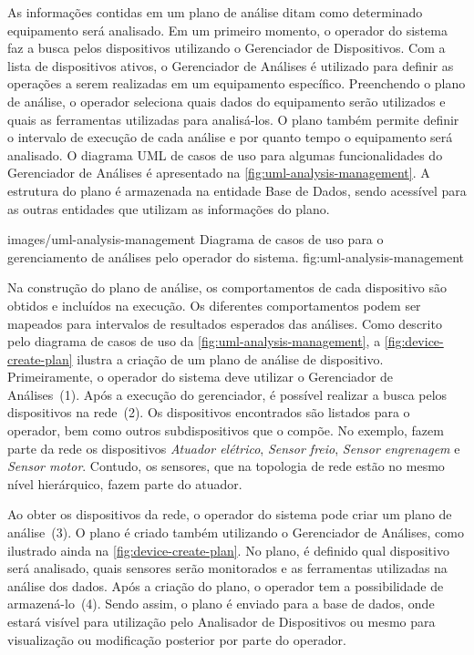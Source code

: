 As informações contidas em um plano de análise ditam como determinado equipamento será analisado. Em
um primeiro momento, o operador do sistema faz a busca pelos dispositivos utilizando o Gerenciador
de Dispositivos. Com a lista de dispositivos ativos, o Gerenciador de Análises é utilizado para
definir as operações a serem realizadas em um equipamento específico. Preenchendo o plano de
análise, o operador seleciona quais dados do equipamento serão utilizados e quais as ferramentas
utilizadas para analisá-los. O plano também permite definir o intervalo de execução de cada análise
e por quanto tempo o equipamento será analisado. O diagrama \gls{UML} de casos de uso para algumas
funcionalidades do Gerenciador de Análises é apresentado na \cref{fig:uml-analysis-management}. A
estrutura do plano é armazenada na entidade Base de Dados, sendo acessível para as outras entidades
que utilizam as informações do plano.

  {images/uml-analysis-management}
  {Diagrama de casos de uso para o gerenciamento de análises pelo operador do sistema.}
  {fig:uml-analysis-management}

Na construção do plano de análise, os comportamentos de cada dispositivo são obtidos e incluídos na
execução. Os diferentes comportamentos podem ser mapeados para intervalos de resultados esperados
das análises. Como descrito pelo diagrama de casos de uso da \cref{fig:uml-analysis-management}, a
\cref{fig:device-create-plan} ilustra a criação de um plano de análise de dispositivo.
Primeiramente, o operador do sistema deve utilizar o Gerenciador de Análises~(1). Após a execução do
gerenciador, é possível realizar a busca pelos dispositivos na rede~(2). Os dispositivos encontrados
são listados para o operador, bem como outros subdispositivos que o compõe. No exemplo, fazem parte
da rede os dispositivos \emph{Atuador elétrico}, \emph{Sensor freio}, \emph{Sensor engrenagem} e
\emph{Sensor motor}. Contudo, os sensores, que na topologia de rede estão no mesmo nível
hierárquico, fazem parte do atuador.

Ao obter os dispositivos da rede, o operador do sistema pode criar um plano de análise~(3). O plano
é criado também utilizando o Gerenciador de Análises, como ilustrado ainda na
\cref{fig:device-create-plan}. No plano, é definido qual dispositivo será analisado, quais sensores
serão monitorados e as ferramentas utilizadas na análise dos dados. Após a criação do plano, o
operador tem a possibilidade de armazená-lo~(4). Sendo assim, o plano é enviado para a base de
dados, onde estará visível para utilização pelo Analisador de Dispositivos ou mesmo para
visualização ou modificação posterior por parte do operador.

